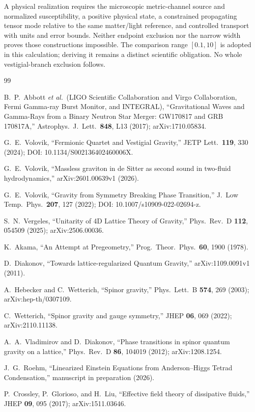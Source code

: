 \documentclass[aps,prd,twocolumn,showpacs,superscriptaddress,nofootinbib]{revtex4-2}
\begin{document}
A physical realization requires the microscopic metric-channel
source and normalized susceptibility, a positive physical state,
a constrained propagating tensor mode relative to the same
matter/light reference, and controlled transport with units and
error bounds. Neither endpoint exclusion nor the narrow width
proves those constructions impossible. The comparison range $[0.1,10]$
is adopted in this calculation; deriving it remains a distinct
scientific obligation. No whole vestigial-branch exclusion follows.


\begin{thebibliography}{99}

 B.~P.~Abbott \emph{et al.}\
(LIGO Scientific Collaboration and Virgo Collaboration,
Fermi Gamma-ray Burst Monitor, and INTEGRAL),
``Gravitational Waves and Gamma-Rays from a Binary Neutron Star
Merger: GW170817 and GRB 170817A,''
Astrophys.\ J.\ Lett.\ \textbf{848}, L13 (2017);
arXiv:1710.05834.

 G.~E.~Volovik, ``Fermionic Quartet
and Vestigial Gravity,'' JETP Lett.\ \textbf{119}, 330 (2024);
DOI: 10.1134/S002136402460006X.

G.~E.~Volovik, ``Massless graviton in de Sitter as second sound in
two-fluid hydrodynamics,'' arXiv:2601.00639v1 (2026).

 G.~E.~Volovik, ``Gravity from Symmetry
Breaking Phase Transition,'' J.\ Low Temp.\ Phys.\
\textbf{207}, 127 (2022); DOI: 10.1007/s10909-022-02694-z.

 S.~N.~Vergeles, ``Unitarity of 4D Lattice
Theory of Gravity,'' Phys.\ Rev.\ D \textbf{112}, 054509 (2025);
arXiv:2506.00036.

 K.~Akama, ``An Attempt at Pregeometry,''
Prog.\ Theor.\ Phys.\ \textbf{60}, 1900 (1978).

 D.~Diakonov, ``Towards lattice-regularized
Quantum Gravity,'' arXiv:1109.0091v1 (2011).

 A.~Hebecker and C.~Wetterich,
``Spinor gravity,'' Phys.\ Lett.\ B \textbf{574}, 269 (2003);
arXiv:hep-th/0307109.

 C.~Wetterich, ``Spinor gravity and gauge
symmetry,'' JHEP \textbf{06}, 069 (2022); arXiv:2110.11138.

 A.~A.~Vladimirov and D.~Diakonov,
``Phase transitions in spinor quantum gravity on a lattice,''
Phys.\ Rev.\ D \textbf{86}, 104019 (2012); arXiv:1208.1254.

 J.~G.~Roehm, ``Linearized Einstein
Equations from Anderson--Higgs Tetrad Condensation,''
manuscript in preparation (2026).

 P.~Crossley, P.~Glorioso, and
H.~Liu, ``Effective field theory of dissipative fluids,''
JHEP \textbf{09}, 095 (2017); arXiv:1511.03646.

\end{thebibliography}
\end{document}
